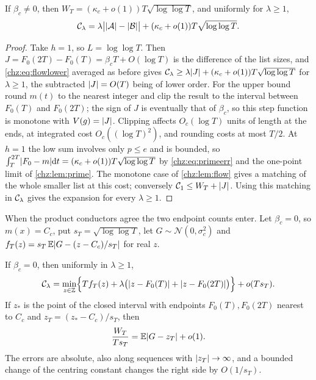 \begin{theorem}\label{chz:thm:fullmatch}
If $\beta_c\ne0$, then $W_T=(\kappa_c+o(1))T\sqrt{\log\log T}$, and uniformly for $\lambda\ge1$,
\[
 \mathcal{C}_\lambda=\lambda\bigl\lvert\lvert\mathcal{A}\rvert-\lvert\mathcal{B}\rvert\bigr\rvert+(\kappa_c+o(1))T\sqrt{\log\log T}.
\]
\end{theorem}

\begin{proof}
Take $h=1$, so $L=\log\log T$. Then $J=F_0(2T)-F_0(T)=\beta_cT+O(\log T)$ is the difference of the list sizes, and
\eqref{chz:eq:flowlower} averaged as before gives $\mathcal{C}_\lambda\ge\lambda\lvert J\rvert+(\kappa_c+o(1))T\sqrt{\log\log T}$ for
$\lambda\ge1$, the subtracted $\lvert J\rvert=O(T)$ being of lower order. For the upper bound round $m(t)$ to the nearest
integer and clip the result to the interval between $F_0(T)$ and $F_0(2T)$; the sign of $J$ is eventually that of
$\beta_c$, so this step function is monotone with $V(g)=\lvert J\rvert$. Clipping affects $O_c(\log T)$ units of length at
the ends, at integrated cost $O_c((\log T)^2)$, and rounding costs at most $T/2$. At $h=1$ the low sum involves
only $p\le e$ and is bounded, so $\int_T^{2T}\lvert F_0-m\rvert\mathrm{d} t=(\kappa_c+o(1))T\sqrt{\log\log T}$ by
\eqref{chz:eq:primeerr} and the one-point limit of \cref{chz:lem:prime}. The monotone case of \cref{chz:lem:flow}
gives a matching of the whole smaller list at this cost; conversely $\mathcal{C}_1\le W_T+\lvert J\rvert$. Using this matching in
$\mathcal{C}_\lambda$ gives the expansion for every $\lambda\ge1$.
\end{proof}

When the product conductors agree the two endpoint counts enter. Let $\beta_c=0$, so $m(x)=C_c$, put
$s_T=\sqrt{\log\log T}$, let $G\sim\mathcal N(0,\sigma_c^2)$ and $f_T(z)=s_T\,\mathbb{E}\lvert G-(z-C_c)/s_T\rvert$ for real $z$.

\begin{theorem}\label{chz:thm:equalcond}
If $\beta_c=0$, then uniformly in $\lambda\ge1$,
\[
 \mathcal{C}_\lambda=\min_{z\in\mathbb{Z}}\Bigl\{Tf_T(z)+\lambda\bigl(\lvert z-F_0(T)\rvert+\lvert z-F_0(2T)\rvert\bigr)\Bigr\}+o(Ts_T).
\]
If $z_*$ is the point of the closed interval with endpoints $F_0(T),F_0(2T)$ nearest to $C_c$ and
$z_T=(z_*-C_c)/s_T$, then
\[
 \frac{W_T}{Ts_T}=\mathbb{E}\lvert G-z_T\rvert+o(1).
\]
The errors are absolute, also along sequences with $\lvert z_T\rvert\to\infty$, and a bounded change of the centring
constant changes the right side by $O(1/s_T)$.
\end{theorem}

